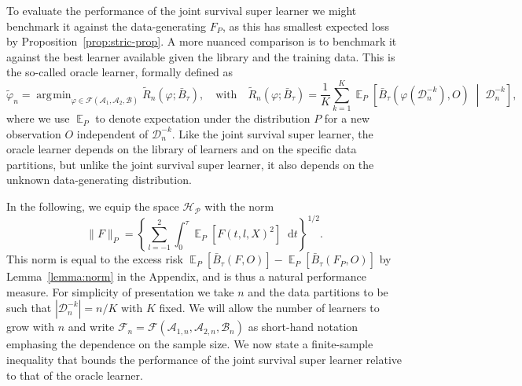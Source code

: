 \documentclass[a4paper,danish]{article}
\theoremstyle{plain} %
\numberwithin{theorem}{section}
\theoremstyle{definition} %
\theoremstyle{remark}
\DeclareMathOperator{\E}{\mathbb{E}} %
\renewcommand{\phi}{\varphi}
\newcommand*\diff{\mathop{}\!\mathrm{d}}
\newcommand{\midd}{\; \middle|\;}
\newcommand{\1}{\mathds{1}}
\DeclareMathOperator*{\argmin}{\arg\!\min}
\newcommand{\data}{\ensuremath{\mathcal{D}}}
\begin{document}
To evaluate the performance of the joint survival super learner we
might benchmark it against the data-generating \( F_P \), as this has
smallest expected loss by Proposition~\ref{prop:stric-prop}. A more
nuanced comparison is to benchmark it against the best learner
available given the library and the training data. This is the
so-called oracle learner, formally defined as
\begin{equation*}
  \tilde{\phi}_n
  =  \argmin_{\phi \in \mathcal{F}(\mathcal{A}_1, \mathcal{A}_2, \mathcal{B}) }
  \tilde{R}_{n}(\phi ; \bar{B}_{\tau}),
  \quad \text{with} \quad 
  \tilde{R}_n(\phi; \bar{B}_{\tau})=
  \frac{1}{K}\sum_{k=1}^{K} 
  \E_P{
    \left[
      \bar{B}_{\tau}
      {
        \left(
          \phi{ (\data_n^{-k})}
          , O
        \right)
      } 
      \midd  \data_n^{-k}
    \right]}
  ,
\end{equation*}
where %
we use \( \E_P \) to denote expectation under the distribution \( P \)
for a new observation \( O \) independent of \( \data_n^{-k} \). Like
the joint survival super learner, the oracle learner depends on the library of learners and on the
specific data partitions, but unlike the joint survival super learner, it also depends on the
unknown data-generating distribution.

In the following, we equip the space \( \mathcal{H}_{\mathcal{P}} \)
with the norm
\begin{equation}
  \label{eq:norm}
  \| F \|_{P} = 
  \left\{
    \sum_{l=-1}^{2}
    \int_0^{\tau} \E_P{\left[ F(t, l, X)^2 \right]} \diff t
  \right\}^{1/2}.
\end{equation}
This norm is equal to the excess risk
\( \E_P{[\bar{B}_\tau(F, O)]} - \E_P{[\bar{B}_\tau(F_P, O)]} \) by
Lemma~\ref{lemma:norm} in the Appendix, and is thus a natural
performance measure. For simplicity of presentation we take \( n \)
and the data partitions to be such that \( |\data_n^{-k}| = n/K \)
with \( K \) fixed. We will allow the number of learners to grow with
\( n \) and write
\( \mathcal{F}_n=\mathcal{F}(\mathcal{A}_{1,n}, \mathcal{A}_{2,n},
\mathcal{B}_n)\) as short-hand notation emphasing the dependence on
the sample size.  We now state a finite-sample inequality that bounds
the performance of the joint survival super learner relative to that of the oracle learner.
\end{document}
